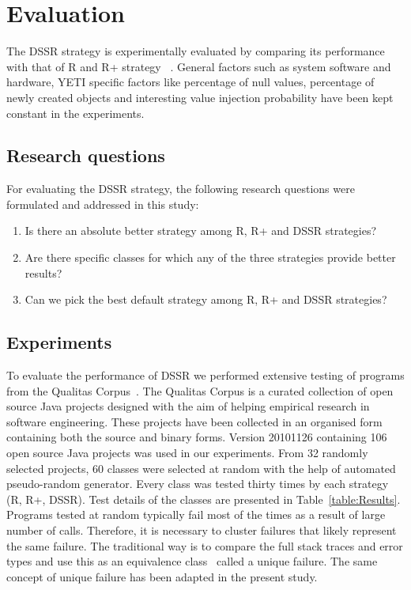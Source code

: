 \documentclass[conference]{IEEEtran}
\begin{document}


\section{Evaluation}\label{sec:eval}
The DSSR strategy is experimentally evaluated by comparing its performance with that of R and R+ strategy ~\cite{Leitner2007}. General factors such as system software and hardware, YETI specific factors like percentage of null values, percentage of newly created objects and interesting value injection probability have been kept constant in the experiments.

\subsection{Research questions}
For evaluating the DSSR strategy, the following research questions were formulated and addressed in this study:
\begin{enumerate}
\item Is there an absolute better strategy among R, R+ and DSSR strategies?
\item Are there specific classes for which any of the three strategies provide better results?
\item Can we pick the best default strategy among R, R+ and DSSR strategies?
\end{enumerate}



\subsection{Experiments}
To evaluate the performance of DSSR we performed extensive testing of programs from the Qualitas Corpus~\cite{Tempero2010}. The Qualitas Corpus is a curated collection of open source Java projects designed with the aim of helping empirical research in  software engineering. These projects have been collected in an organised form containing both the source and binary forms. Version 20101126 containing 106 open source Java projects was used in our experiments. From 32 randomly selected projects, 60 classes were selected at random with the help of automated pseudo-random generator. Every class was tested thirty times by each strategy (R, R+, DSSR). Test details of the classes are presented in Table~\ref{table:Results}. Programs tested at random typically fail most of the times as a result of large number of calls. Therefore, it is necessary to cluster failures that likely represent the same failure. The traditional way is to compare the full stack traces and error types and use this as an equivalence class~\cite{Ciupa2007, Oriol2012} called a unique failure. The same concept of unique failure has been adapted in the present study.  
\end{document}
